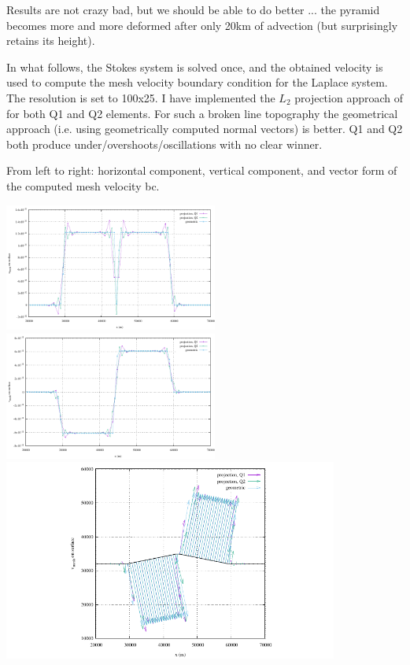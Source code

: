 Results are not crazy bad, but we should be able to do better ... the pyramid 
becomes more and more deformed after only 20km of advection (but surprisingly retains its height). 



In what follows, the Stokes system is solved once, and the obtained velocity
is used to compute the mesh velocity boundary condition for the Laplace system. 
The resolution is set to 100x25. I have implemented the $L_2$ projection approach 
of \cite{robh17} for both Q1 and Q2 elements. For such a broken line topography the 
geometrical approach (i.e. using geometrically computed normal vectors) is better.
Q1 and Q2 both produce under/overshoots/oscillations with no clear winner. 

From left to right: horizontal component, vertical component, and vector form 
of the computed mesh velocity bc.

\begin{center}
\includegraphics[width=7cm]{python_codes/fieldstone_54/images/exp8/100x25/umesh}
\includegraphics[width=7cm]{python_codes/fieldstone_54/images/exp8/100x25/vmesh}\\
\includegraphics[width=11cm]{python_codes/fieldstone_54/images/exp8/100x25/velmesh}
\end{center}

